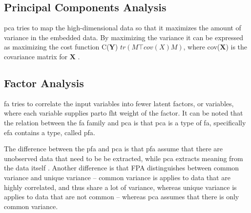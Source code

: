 
\subsection{Principal Components Analysis}\label{subsec:principal-components-analysis}
\gls{pca} tries to map the high-dimensional data so that it maximizes the amount of variance in the embedded data. By maximizing the variance it can be expressed as maximizing the cost function C($\mathbf{Y}$) $tr(M\top cov(X)M)$, where cov($\mathbf{X}$) is the covariance matrix for $\mathbf{X}$ \cite{dimensionality-reduction-comparative-review}.



    

\subsection{Factor Analysis}\label{subsec:factor-analysis}
\gls{fa} tries to correlate the input variables into fewer latent factors, or variables, where each variable supplies parto fht weight of the factor. It can be noted that the relation between the \gls{fa} family and \gls{pca} is that \gls{pca} is a type of \gls{fa}, specifically \gls{efa}  contains a type, called \gls{pfa}.

The difference between the \gls{pfa} and \gls{pca} is that \gls{pfa} assume that there are unobserved data that need to be be extracted, while \gls{pca} extracts meaning from the data itself \cite{factor-analysis-introduction}. Another difference is that FPA distinguishes between common variance and unique variance -- common variance is applies to data that are highly correlated, and thus share a lot of variance, whereas unique variance is applies to data that are not common -- whereas \gls{pca} assumes that there is only common variance. 



